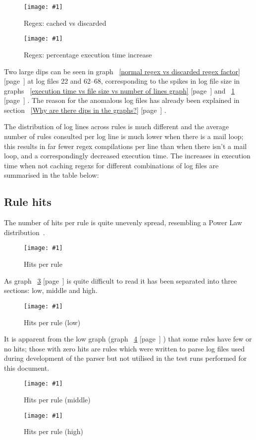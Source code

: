 \documentclass[a4paper,12pt,draft]{article}
\newcommand{\showgraph}[3]{
    \begin{figure}[hbt!]
        \caption{#2}\label{#3}
        \texttt{[image: \#1]}
    \end{figure}
}
\newcommand{\refwithpage}[1]{%
    \empty{}\ref{#1} [page~\pageref{#1}]%
}
\begin{document}
\showgraph{build/plot-cached-discarded.ps}{Regex: cached vs
discarded}{normal regex vs discard regex}

\showgraph{build/plot-cached-discarded-factor.ps}{Regex: percentage
execution time increase}{normal regex vs discarded regex factor}

Two large dips can be seen in graph~\refwithpage{normal regex vs discarded
regex factor} at log files 22 and 62--68, corresponding to the spikes in
log file size in graphs~\refwithpage{execution time vs file size vs number
of lines graph} and~\refwithpage{normal regex vs discard regex}.  The
reason for the anomalous log files has already been explained in
section~\refwithpage{Why are there dips in the graphs?}.

The distribution of log lines across rules is much different and the
average number of rules consulted per log line is much lower when there is
a mail loop; this results in far fewer regex compilations per line than
when there isn't a mail loop, and a correspondingly decreased execution
time.  The increases in execution time when not caching regexs for
different combinations of log files are summarised in the table below:




\subsection{Rule hits}
\label{rule hits}

The number of hits per rule is quite unevenly spread, resembling a Power
Law distribution~\cite{powerlaw}.

\showgraph{build/plot-hits.ps}{Hits per rule}{rule hits graph}

As graph~\refwithpage{rule hits graph} is quite difficult to read it has
been separated into three sections: low, middle and high.

\showgraph{build/plot-hits-low.ps}{Hits per rule (low)}{hits per rule low}

It is apparent from the low graph (graph~\refwithpage{hits per rule low})
that some rules have few or no hits; those with zero hits are rules which
were written to parse log files used during development of the parser but
not utilised in the test runs performed for this document.

\showgraph{build/plot-hits-middle.ps}{Hits per rule (middle)}{hits per rule
middle}

\showgraph{build/plot-hits-high.ps}{Hits per rule (high)}{hits per rule
high}
\end{document}
